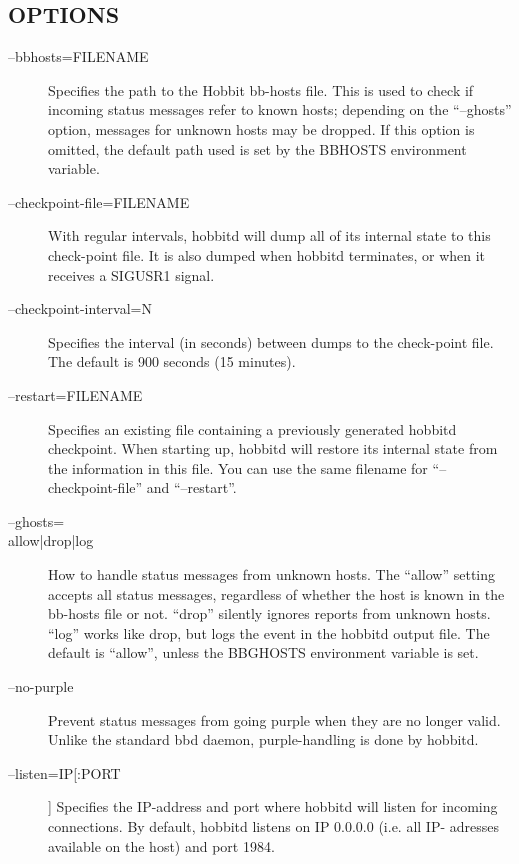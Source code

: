  
\subsection{OPTIONS}
\begin{description}
\item[--bbhosts=FILENAME] Specifies the path to the Hobbit bb-hosts file. This is used to check if incoming status messages refer to known hosts; depending on the ``--ghosts'' option, messages for unknown hosts may be dropped. If this option is omitted, the default path used is set by the BBHOSTS environment variable. 

 

\item[--checkpoint-file=FILENAME] With regular intervals, hobbitd will dump all of its internal state to this check-point file. It is also dumped when hobbitd terminates, or when it receives a SIGUSR1 signal. 

 

\item[--checkpoint-interval=N] Specifies the interval (in seconds) between dumps to the check-point file. The default is 900 seconds (15 minutes). 

 

\item[--restart=FILENAME] Specifies an existing file containing a previously generated hobbitd checkpoint. When starting up, hobbitd will restore its internal state from the information in this file. You can use the same filename for ``--checkpoint-file'' and ``--restart''. 

 

\item[--ghosts= \\{allow|drop|log\\}] How to handle status messages from unknown hosts. The ``allow'' setting accepts all status messages, regardless of whether the host is known in the bb-hosts file or not. ``drop'' silently ignores reports from unknown hosts. ``log'' works like drop, but logs the event in the hobbitd output file. The default is ``allow'', unless the BBGHOSTS environment variable is set. 

 

\item[--no-purple] Prevent status messages from going purple when they are no longer valid. Unlike the standard bbd daemon, purple-handling is done by hobbitd. 

 

\item[--listen=IP[:PORT]] Specifies the IP-address and port where hobbitd will listen for incoming connections. By default, hobbitd listens on IP 0.0.0.0 (i.e. all IP- adresses available on the host) and port 1984. 


\end{description}
